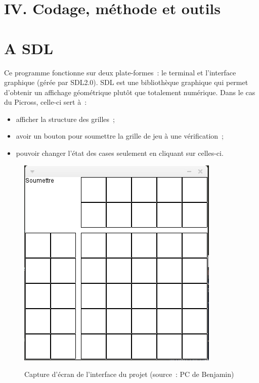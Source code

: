 \documentclass[a4paper,11pt]{article}
\begin{document}
\section*{\LARGE IV. Codage, méthode et outils}
\label{section*:codage_methode_outils}
\section*{A \hspace*{0.3cm} SDL}
\label{section:sdl}
Ce programme fonctionne sur deux plate-formes~: le terminal et l'interface graphique (gérée par SDL2.0). SDL est une bibliothèque graphique qui permet d’obtenir un affichage géométrique plutôt que totalement numérique. Dans le cas du Picross, celle-ci sert à~:\medbreak
\begin{itemize}[label=$\square$]
	\item afficher la structure des grilles~;
	\item avoir un bouton pour soumettre la grille de jeu à une vérification~;
	\item pouvoir changer l’état des cases seulement en cliquant sur celles-ci.
\end{itemize}
\begin{figure}[!h]
	\centering
	\caption[Capture d'écran de l'interface du projet]{Capture d'écran de l'interface du projet (source~: PC de Benjamin)}\medbreak
	\includegraphics[scale=0.5]{sdl.png}\medbreak
	\label{figure:capture_ecran_sdl2}
\end{figure}\bigbreak
\end{document}
